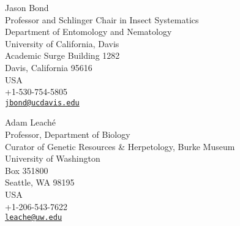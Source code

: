 Jason Bond \\
\myIndent Professor and Schlinger Chair in Insect Systematics \\
\myIndent Department of Entomology and Nematology \\
\myIndent University of California, Davis \\
\myIndent Academic Surge Building 1282 \\
\myIndent Davis, California 95616 \\
\myIndent USA \\
\myIndent +1-530-754-5805 \\
\myIndent \href{mailto:jbond@ucdavis.edu}{\tt jbond@ucdavis.edu}



Adam Leach\'{e} \\
\myIndent Professor, Department of Biology \\
\myIndent Curator of Genetic Resources \& Herpetology, Burke Museum \\
\myIndent University of Washington \\
\myIndent Box 351800 \\
\myIndent Seattle, WA 98195\\
\myIndent USA \\
\myIndent +1-206-543-7622 \\
\myIndent \href{mailto:leache@uw.edu}{\tt leache@uw.edu}


